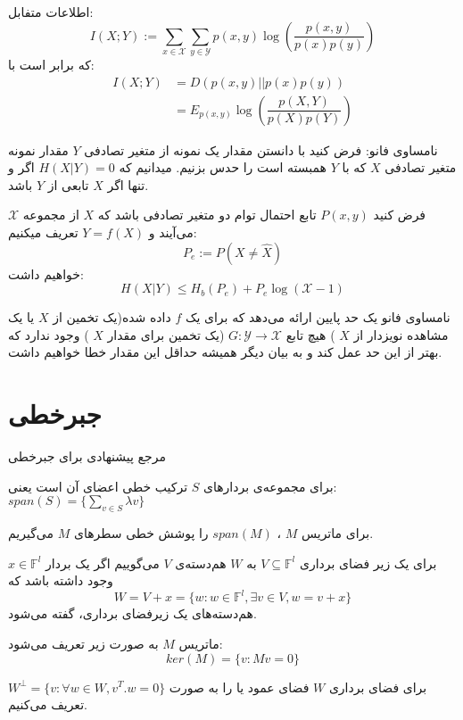 \begin{definition}
اطلاعات متفابل:
$$I(X; Y) := \sum_{x \in \mathcal{X}} \sum_{y \in \mathcal{Y}} p(x, y) \log(\dfrac{p(x, y)}{p(x)p(y)})$$
که برابر است با:
\begin{align*}
    I(X;Y) &= D(p(x, y) || p(x)p(y))
    \\
    &= E_{p(x, y)} \log(\dfrac{p(X, Y)}{p(X)p(Y)})
\end{align*}
\end{definition}
نامساوی فانو: فرض کنید با دانستن مقدار یک نمونه از متغیر تصادفی
$Y$
مقدار نمونه متغیر تصادفی
$X$
که با
$Y$
همبسته است را حدس بزنیم. میدانیم که
$H(X|Y) = 0$
اگر و تنها اگر
$X$
تابعی از
$Y$
باشد. 
\begin{theorem}[
	فانو
	]
فرض کنید
$P(x, y)$
تابع احتمال توام دو متغیر تصادفی باشد که
$X$
از مجموعه
$\mathcal{X}$
می‌آیند و
$Y = f(X)$
تعریف میکنیم:
$$P_e := P(X \neq \hat{X})$$
خواهیم داشت:
$$H(X|Y) \leq H_b(P_e) + P_e \log(\mathcal{X} - 1)$$
\end{theorem}
\begin{remark}
نامساوی فانو یک حد پایین ارائه می‌دهد که برای یک
$f$
داده شده(یک تخمین از
$X$
یا یک مشاهده نویزدار از
$X$
) هیچ تابع
$G:\mathcal{Y} \rightarrow \mathcal{X}$
(یک تخمین برای مقدار
$X$
) وجود ندارد که بهتر از این حد عمل کند و به بیان دیگر همیشه حداقل این مقدار خطا خواهیم داشت.
\end{remark}
\section{جبرخطی}
مرجع پیشنهادی برای جبرخطی
\cite{sheldon}

\begin{definition}
	برای مجموعه‌ی بردار‌های
	$S$
	ترکیب خطی اعضای آن است یعنی:
	$span(S) = \{ \sum\limits_{v \in S} \lambda v\}$
	
	برای ماتریس
	$M$
	،
	$span(M)$
را پوشش خطی سطرهای 
$M$
می‌گیریم.
\end{definition}

\begin{definition}[
	همدسته
	]
	برای یک زیر فضای برداری
	$V \subseteq \mathbb{F}^l$
	به
	$W$
	هم‌دسته‌‌‌ی
	$V$
	می‌گوییم اگر یک بردار
	$x \in \mathbb{F}^l$
	وجود داشته باشد که
	$$W = V + x = \{w: w \in \mathbb{F}^l, \exists v \in V, w = v + x\}$$
	هم‌دسته‌های یک زیرفضای برداری،
	گفته می‌شود.
\end{definition}
\begin{definition}[
	هسته
	]
	ماتریس
	$M$
	به صورت زیر تعریف می‌شود:
	$$ker(M) = \{v: Mv = 0\}$$
\end{definition}
برای فضای برداری
$W$
فضای عمود یا
 را به صورت
$W^\bot = \{v: \forall w \in W, v^T.w = 0\}$
تعریف می‌کنیم.

